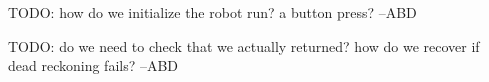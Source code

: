 
\begin{DoxyRefList}
\item[File \mbox{\hyperlink{Syringenator_8py}{Syringenator.py}} ]\label{todo__todo000001}%
%
T\+O\+DO\+: how do we initialize the robot run? a button press? --A\+BD 
\item[Member \mbox{\hyperlink{namespaceSyringenator_afe04905c8a4a9d077457422866633203}{Syringenator.return\+To\+Line}} ()]\label{todo__todo000002}%
%
T\+O\+DO\+: do we need to check that we actually returned? how do we recover if dead reckoning fails? --A\+BD 
\end{DoxyRefList}